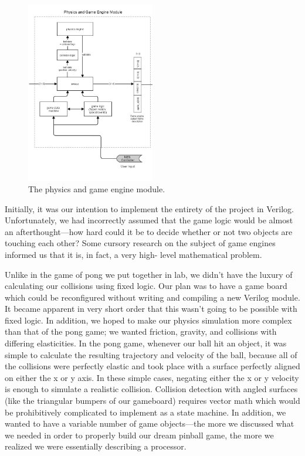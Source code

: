 \documentclass{article}
\begin{document}
\begin{figure}[H]
\begin{center}
\includegraphics[width=0.5\textwidth]{physics} 
\caption{The physics and game engine module.}
\end{center}
\end{figure}

Initially, it was our intention to implement the entirety of the project in Verilog. Unfortunately, we had incorrectly assumed that the game logic would be almost an afterthought---how hard could it be to decide whether or not two objects are touching each other? Some cursory research on the subject of game engines informed us that it is, in fact, a very high-
level mathematical problem.

Unlike in the game of pong we put together in lab, we didn't have the luxury of calculating our collisions using fixed logic. Our plan was to have a game board which could be reconfigured without writing and compiling a new Verilog module. It became apparent in very short order that this wasn't going to be possible with fixed logic. In addition, we hoped to make our physics simulation more complex than that of the pong game; we wanted friction, gravity, and collisions with differing elasticities. In the pong game, whenever our ball hit an object, it was simple to calculate the resulting trajectory and velocity of the ball, because all of the collisions were perfectly elastic and took place with a surface perfectly aligned on either the x or y axis. In these simple cases, negating either the x or y velocity is enough to simulate a realistic collision. Collision detection with angled surfaces (like the triangular bumpers of our gameboard) requires vector math which would be prohibitively complicated to implement as a state machine. In addition, we wanted to have a variable number of game objects---the more we discussed what we needed in order to properly build our dream pinball game, the more we realized we were essentially describing a processor. 
\end{document}

